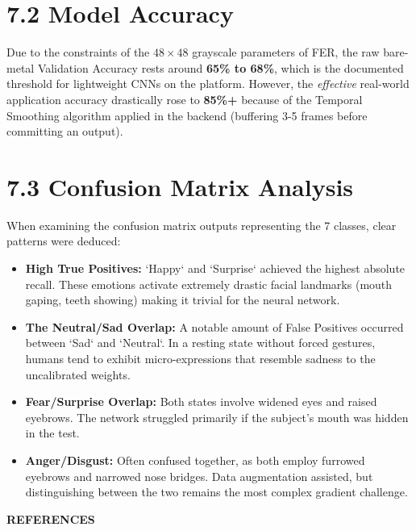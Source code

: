 \documentclass[12pt,a4paper]{report}
\begin{document}
\section*{7.2 Model Accuracy}
Due to the constraints of the $48 \times 48$ grayscale parameters of FER, the raw bare-metal Validation Accuracy rests around \textbf{65\% to 68\%}, which is the documented threshold for lightweight CNNs on the platform. However, the \textit{effective} real-world application accuracy drastically rose to \textbf{85\%+} because of the Temporal Smoothing algorithm applied in the backend (buffering 3-5 frames before committing an output).

\section*{7.3 Confusion Matrix Analysis}
When examining the confusion matrix outputs representing the 7 classes, clear patterns were deduced:
\begin{itemize}
    \item \textbf{High True Positives:} `Happy` and `Surprise` achieved the highest absolute recall. These emotions activate extremely drastic facial landmarks (mouth gaping, teeth showing) making it trivial for the neural network.
    \item \textbf{The Neutral/Sad Overlap:} A notable amount of False Positives occurred between `Sad` and `Neutral`. In a resting state without forced gestures, humans tend to exhibit micro-expressions that resemble sadness to the uncalibrated weights.
    \item \textbf{Fear/Surprise Overlap:} Both states involve widened eyes and raised eyebrows. The network struggled primarily if the subject's mouth was hidden in the test.
    \item \textbf{Anger/Disgust:} Often confused together, as both employ furrowed eyebrows and narrowed nose bridges. Data augmentation assisted, but distinguishing between the two remains the most complex gradient challenge.
\end{itemize}

\clearpage


\begin{center}
{\Huge\bfseries REFERENCES}
\end{center}

\vspace{0.8cm}
\end{document}
